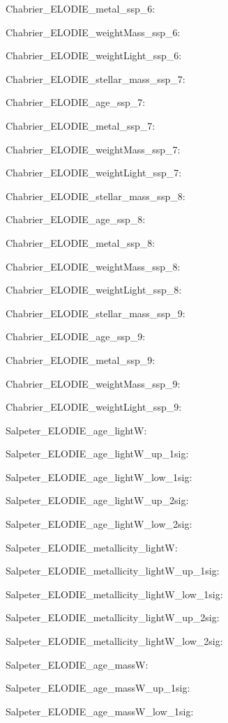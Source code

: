 \item Chabrier\_ELODIE\_metal\_ssp\_6: 
\item Chabrier\_ELODIE\_weightMass\_ssp\_6: 
\item Chabrier\_ELODIE\_weightLight\_ssp\_6: 
\item Chabrier\_ELODIE\_stellar\_mass\_ssp\_7: 
\item Chabrier\_ELODIE\_age\_ssp\_7: 
\item Chabrier\_ELODIE\_metal\_ssp\_7: 
\item Chabrier\_ELODIE\_weightMass\_ssp\_7: 
\item Chabrier\_ELODIE\_weightLight\_ssp\_7: 
\item Chabrier\_ELODIE\_stellar\_mass\_ssp\_8: 
\item Chabrier\_ELODIE\_age\_ssp\_8: 
\item Chabrier\_ELODIE\_metal\_ssp\_8: 
\item Chabrier\_ELODIE\_weightMass\_ssp\_8: 
\item Chabrier\_ELODIE\_weightLight\_ssp\_8: 
\item Chabrier\_ELODIE\_stellar\_mass\_ssp\_9: 
\item Chabrier\_ELODIE\_age\_ssp\_9: 
\item Chabrier\_ELODIE\_metal\_ssp\_9: 
\item Chabrier\_ELODIE\_weightMass\_ssp\_9: 
\item Chabrier\_ELODIE\_weightLight\_ssp\_9: 
\item Salpeter\_ELODIE\_age\_lightW: 
\item Salpeter\_ELODIE\_age\_lightW\_up\_1sig: 
\item Salpeter\_ELODIE\_age\_lightW\_low\_1sig: 
\item Salpeter\_ELODIE\_age\_lightW\_up\_2sig: 
\item Salpeter\_ELODIE\_age\_lightW\_low\_2sig: 
\item Salpeter\_ELODIE\_metallicity\_lightW: 
\item Salpeter\_ELODIE\_metallicity\_lightW\_up\_1sig: 
\item Salpeter\_ELODIE\_metallicity\_lightW\_low\_1sig: 
\item Salpeter\_ELODIE\_metallicity\_lightW\_up\_2sig: 
\item Salpeter\_ELODIE\_metallicity\_lightW\_low\_2sig: 
\item Salpeter\_ELODIE\_age\_massW: 
\item Salpeter\_ELODIE\_age\_massW\_up\_1sig: 
\item Salpeter\_ELODIE\_age\_massW\_low\_1sig: 
